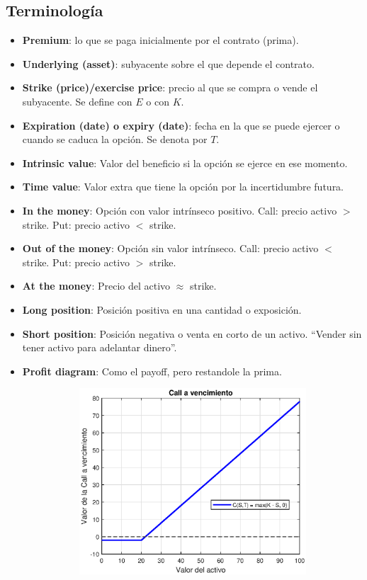 \subsection{Terminología}
\begin{itemize}
    \item \textbf{Premium}: lo que se paga inicialmente por el contrato (prima).
    \item \textbf{Underlying (asset)}: subyacente sobre el que depende el contrato.
    \item \textbf{Strike (price)/exercise price}: precio al que se compra o vende el subyacente. Se define con $E$ o con $K$.
    \item \textbf{Expiration (date) o expiry (date)}: fecha en la que se puede ejercer o cuando se caduca la opción. Se denota por $T$.
    \item \textbf{Intrinsic value}: Valor del beneficio si la opción se ejerce en ese momento.
    \item \textbf{Time value}: Valor extra que tiene la opción por la incertidumbre futura.
    \item \textbf{In the money}: Opción con valor intrínseco positivo. Call: precio activo $>$ strike. Put: precio activo $<$ strike.
    \item \textbf{Out of the money}: Opción sin valor intrínseco. Call: precio activo $<$ strike. Put: precio activo $>$ strike.
    \item \textbf{At the money}: Precio del activo $\approx$ strike.
    \item \textbf{Long position}: Posición positiva en una cantidad o exposición.
    \item \textbf{Short position}: Posición negativa o venta en corto de un activo. ``Vender sin tener activo para adelantar dinero''.
    \item \textbf{Profit diagram}: Como el payoff, pero restandole la prima.
    \begin{figure}[H]
        \centering
        \begin{subfigure}[b]{0.45\linewidth}
            \includegraphics[width=\linewidth]{Imagenes/2_Derivados/ProfitDiagCall.eps}

\end{subfigure}
\end{figure}
\end{itemize}
